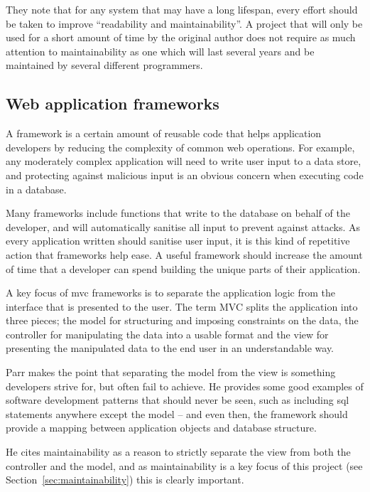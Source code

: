 \documentclass[draft]{scrartcl}
\begin{document}
They note that for any system that may have a long lifespan, every effort
should be taken to improve ``readability and maintainability''. A project that
will only be used for a short amount of time by the original author does not
require as much attention to maintainability as one which will last several
years and be maintained by several different programmers.

\subsection{Web application frameworks}


A framework is a certain amount of reusable code that helps application
developers by reducing the complexity of common web operations. For example,
any moderately complex application will need to write user input to a data
store, and protecting against malicious input is an obvious concern when
executing code in a database.

Many frameworks include functions that write to the database on behalf of the
developer, and will automatically sanitise all input to prevent against
attacks. As every application written should sanitise user input, it is this
kind of repetitive action that frameworks help ease. A useful framework should
increase the amount of time that a developer can spend building the unique
parts of their application.

A key focus of \gls{mvc} frameworks is to separate the application logic from
the interface that is presented to the user. The term MVC splits the
application into three pieces; the model for structuring and imposing
constraints on the data, the controller for manipulating the data into a
usable format and the view for presenting the manipulated data to the end user
in an understandable way.

Parr \cite{Parr2004templateengines} makes the point that separating the model
from the view is something developers strive for, but often fail to achieve.
He provides some good examples of software development patterns that should
never be seen, such as including \gls{sql} statements anywhere except the
model -- and even then, the framework should provide a mapping between
application objects and database structure.

He cites maintainability as a reason to strictly separate the view from both
the controller and the model, and as maintainability is a key focus of this
project (see Section~\ref{sec:maintainability}) this is clearly important.
\end{document}
